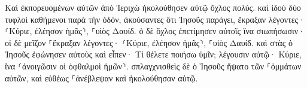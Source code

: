 \documentclass{openreader}
\begin{document}
Καὶ ἐκπορευομένων αὐτῶν ἀπὸ Ἰεριχὼ ἠκολούθησεν αὐτῷ ὄχλος πολύς. 
καὶ ἰδοὺ δύο τυφλοὶ καθήμενοι παρὰ τὴν ὁδόν, ἀκούσαντες ὅτι Ἰησοῦς παράγει, ἔκραξαν λέγοντες· ⸂Κύριε, ἐλέησον ἡμᾶς⸃, ⸀υἱὸς Δαυίδ. 
ὁ δὲ ὄχλος ἐπετίμησεν αὐτοῖς ἵνα σιωπήσωσιν· οἱ δὲ μεῖζον ⸀ἔκραξαν λέγοντες· ⸂Κύριε, ἐλέησον ἡμᾶς⸃, ⸀υἱὸς Δαυίδ. 
καὶ στὰς ὁ Ἰησοῦς ἐφώνησεν αὐτοὺς καὶ εἶπεν· Τί θέλετε ποιήσω ὑμῖν; 
λέγουσιν αὐτῷ· Κύριε, ἵνα ⸂ἀνοιγῶσιν οἱ ὀφθαλμοὶ ἡμῶν⸃. 
σπλαγχνισθεὶς δὲ ὁ Ἰησοῦς ἥψατο τῶν ⸀ὀμμάτων αὐτῶν, καὶ εὐθέως ⸀ἀνέβλεψαν καὶ ἠκολούθησαν αὐτῷ. 
\end{document}
